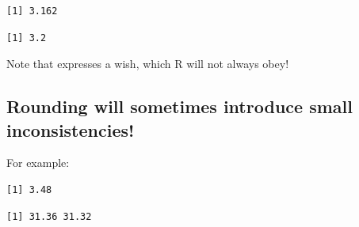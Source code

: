 \begin{knitrout}
\color{fgcolor}\begin{kframe}
\begin{alltt}
\hlstd{(}\hlstd{)}
\end{alltt}
\begin{verbatim}
[1] 3.162
\end{verbatim}
\begin{alltt}
 \hlkwb{<-} \hlstd{(}\hlstd{=}\hlstd{)} 
\hlstd{(}\hlstd{)}
\end{alltt}
\begin{verbatim}
[1] 3.2
\end{verbatim}
\begin{alltt}
             
\end{alltt}
\end{kframe}
\end{knitrout}
Note that  expresses a wish, which
R will not always obey!

\subsection*{Rounding will sometimes introduce small inconsistencies!}

For example:
\begin{knitrout}
\color{fgcolor}\begin{kframe}
\begin{alltt}
\hlstd{(}\hlstd{(}\hlopt{/}\hlstd{),} \hlstd{)}
\end{alltt}
\begin{verbatim}
[1] 3.48
\end{verbatim}
\begin{alltt}
\hlstd{(}\hlstd{(}\hlstd{(}\hlopt{/}\hlstd{)}\hlopt{*}\hlstd{,}  \hlopt{*}\hlstd{),} \hlstd{)}
\end{alltt}
\begin{verbatim}
[1] 31.36 31.32
\end{verbatim}
\end{kframe}
\end{knitrout}

